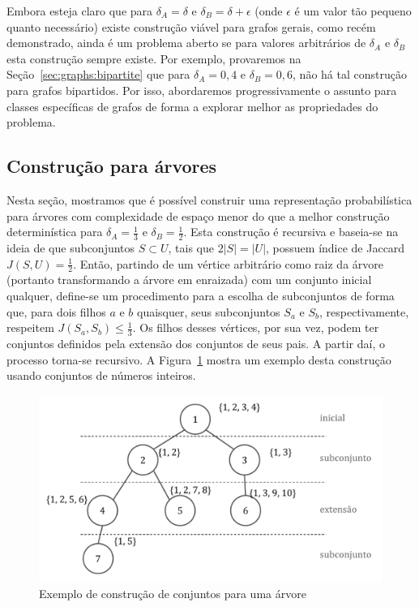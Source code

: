 Embora esteja claro que para $\delta_A = \delta$ e $\delta_B = \delta + \epsilon$ (onde $\epsilon$ é um valor tão pequeno quanto necessário) existe construção viável para grafos gerais, como recém demonstrado, ainda é um problema aberto se para valores arbitrários de $\delta_A$ e $\delta_B$ esta construção sempre existe. Por exemplo, provaremos na Seção~\ref{sec:graphs:bipartite} que para $\delta_A = 0,4$ e $\delta_B = 0,6$, não há tal construção para grafos bipartidos. Por isso, abordaremos progressivamente o assunto para classes específicas de grafos de forma a explorar melhor as propriedades do problema.

\subsection{Construção para árvores}

Nesta seção, mostramos que é possível construir uma representação probabilística para árvores com complexidade de espaço menor do que a melhor construção determinística para  $\delta_A = \frac{1}{3}$ e $\delta_B = \frac{1}{2}$. Esta construção é recursiva e baseia-se na ideia de que subconjuntos $S \subset U$, tais que $2|S| = |U|$, possuem índice de Jaccard $J(S, U) = \frac{1}{2}$. Então, partindo de um vértice arbitrário como raiz da árvore (portanto transformando a árvore em enraizada) com um conjunto inicial qualquer, define-se um procedimento para a escolha de subconjuntos de forma que, para dois filhos $a$ e $b$ quaisquer, seus subconjuntos $S_a$ e $S_b$, respectivamente, respeitem $J(S_a, S_b) \leq \frac{1}{3}$. Os filhos desses vértices, por sua vez, podem ter conjuntos definidos pela extensão dos conjuntos de seus pais. A partir daí, o processo torna-se recursivo. A Figura~\ref{fig:graph_tree_ex1} mostra um exemplo desta construção usando conjuntos de números inteiros.

\begin{figure}[!htbp]
  \centering
  \includegraphics[scale=0.6]{figures/graphs_tree_ex1.pdf}
  \caption{Exemplo de construção de conjuntos para uma árvore}
  \label{fig:graph_tree_ex1}
\end{figure}

